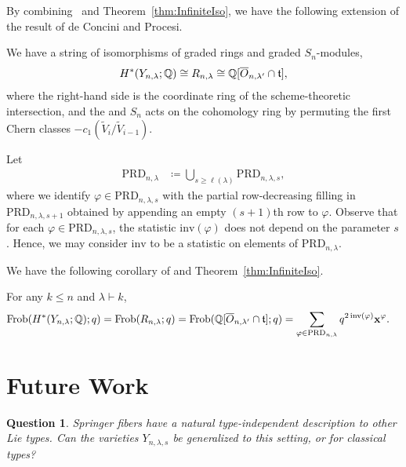 \documentclass[12pt]{amsart}
\newcommand{\Frob}{\mathrm{Frob}}
\newcommand{\la}{\lambda}
\newcommand{\inv}{\mathrm{inv}}
\newcommand{\bx}{\mathbf{x}}
\newcommand{\ft}{\mathfrak{t}}
\newtheorem{question}{Question}
\begin{document}
By combining~\cite[Corollary 6.4]{GriffinOSP} and Theorem~\ref{thm:InfiniteIso}, we have the following extension of the result of de Concini and Procesi.

\begin{corollary}
We have a string of isomorphisms of graded rings and graded $S_n$-modules,
\begin{align}
H^*(Y_{n,\la};\bQ) \cong R_{n,\la} \cong \bQ[\overline{O}_{n,\la'}\cap \ft],
\end{align}
where the right-hand side is the coordinate ring of the scheme-theoretic intersection, and the  and $S_n$ acts on the cohomology ring by permuting the first Chern classes $-c_1(\widetilde V_i/\widetilde V_{i-1})$.
\end{corollary}


Let 
\begin{align}
\mathrm{PRD}_{n,\la} &\coloneqq \bigcup_{s\geq \ell(\la)} \mathrm{PRD}_{n,\la, s},
\end{align}
where we identify $\varphi\in \mathrm{PRD}_{n,\la, s}$ with the partial row-decreasing filling in $\mathrm{PRD}_{n,\la, s+1}$ obtained by appending an empty $(s+1)$th row to $\varphi$. Observe that for each $\varphi \in \mathrm{PRD}_{n,\la, s}$, the statistic $\inv(\varphi)$ does not depend on the parameter $s$. Hence, we may consider $\inv$ to be a statistic on elements of $\mathrm{PRD}_{n,\la}$.

We have the following corollary of \cite[Theorem 6.6]{GriffinOSP} and Theorem~\ref{thm:InfiniteIso}.

\begin{corollary}
For any $k\leq n$ and $\la\vdash k$,
\begin{align}
\Frob(H^*(Y_{n,\la};\bQ);q) = \Frob(R_{n,\la};q) = \Frob(\bQ[\overline{O}_{n,\la'} \cap \ft];q)  &= \sum_{\varphi \in \mathrm{PRD}_{n,\la}} q^{2\,\inv(\varphi)} \bx^\varphi.
\end{align}
\end{corollary}





\section{Future Work}\label{sec:FutureWork}

\begin{question}
Springer fibers have a natural type-independent description to other Lie types. Can the varieties $Y_{n,\la,s}$ be generalized to this setting, or for classical types?
\end{question}
\end{document}
